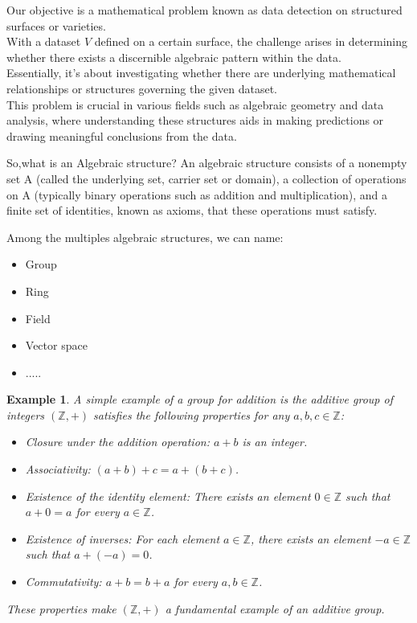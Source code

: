 \documentclass{report}
\newtheorem{Example}{Example}
\begin{document}
    Our objective is a mathematical problem known 
        as data detection on structured surfaces or 
        varieties.  \\
        With a dataset $V$ 
        defined on a certain surface, the challenge 
        arises in determining whether there exists a 
        discernible algebraic pattern within the data. 
        \\ 
        Essentially, it's about investigating whether 
        there are underlying mathematical relationships 
        or structures governing the given dataset. 
        \\ 
        This problem is crucial in various fields 
        such as algebraic geometry and data analysis, 
        where understanding these structures aids in 
        making predictions or drawing meaningful 
        conclusions from the data.



    So,what is an Algebraic structure? An algebraic structure consists of a nonempty set A (called the underlying set, carrier set or domain), a collection of operations on A (typically binary operations such as addition and multiplication), and a finite set of identities, known as axioms, that these operations must satisfy.

    Among the multiples algebraic structures, we can name:
    \begin{itemize}
        \item Group
        \item Ring
        \item Field
        \item Vector space
                \item .....
            \end{itemize}

        \begin{Example}
            A simple example of a group for 
            addition is the additive group 
            of integers $ (\mathbb{Z}, +) $ 
            satisfies the following properties 
            for any $ a, b, c \in \mathbb{Z} $:
            \begin{itemize}
                \item Closure under the addition operation: $ a + b $ is an integer.
                \item Associativity: $ (a + b) + c = a + (b + c) $.
                \item Existence of the identity element: There exists an element $ 0 \in \mathbb{Z} $ such that $ a + 0 = a $ for every $ a \in \mathbb{Z} $.
                \item Existence of inverses: For each element $ a \in \mathbb{Z} $, there exists an element $ -a \in \mathbb{Z} $ such that $ a + (-a) = 0 $.
                \item Commutativity: $ a + b = b + a $ for every $ a, b \in \mathbb{Z} $.
            \end{itemize}
        These properties make $ (\mathbb{Z}, +) $ a fundamental example of an additive group.
            
        \end{Example}  
\end{document}
